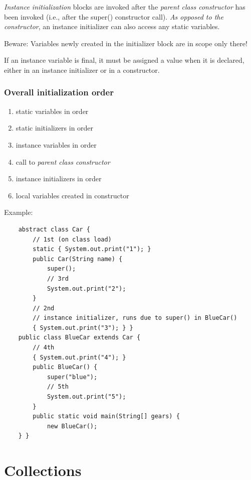 \documentclass{scrartcl}
\begin{document}
    \textit{Instance initialization} blocks are invoked after the \textit{parent class constructor} has been invoked (i.e., after the super() constructor call).
   \textit{ As opposed to the constructor}, an instance initializer can also access any static variables.

    Beware: Variables newly created in the initializer block are in scope only there!

    If an instance variable is final, it must be assigned a value when it is declared, either in an instance initializer or in a constructor.

\subsubsection{Overall initialization order}

    \begin{enumerate}
        \item static variables in order
        \item static initializers in order
        \item instance variables in order
        \item call to \textit{parent class constructor}
        \item instance initializers in order
        \item local variables created in constructor
    \end{enumerate}

Example:

\begin{lstlisting}
    abstract class Car {
        // 1st (on class load)
        static { System.out.print("1"); }
        public Car(String name) {
            super();
            // 3rd
            System.out.print("2");
        }
        // 2nd
        // instance initializer, runs due to super() in BlueCar()
        { System.out.print("3"); } }
    public class BlueCar extends Car {
        // 4th
        { System.out.print("4"); }
        public BlueCar() {
            super("blue");
            // 5th
            System.out.print("5");
        }
        public static void main(String[] gears) {
            new BlueCar();
    } }
\end{lstlisting}


\section{Collections}
\end{document}
